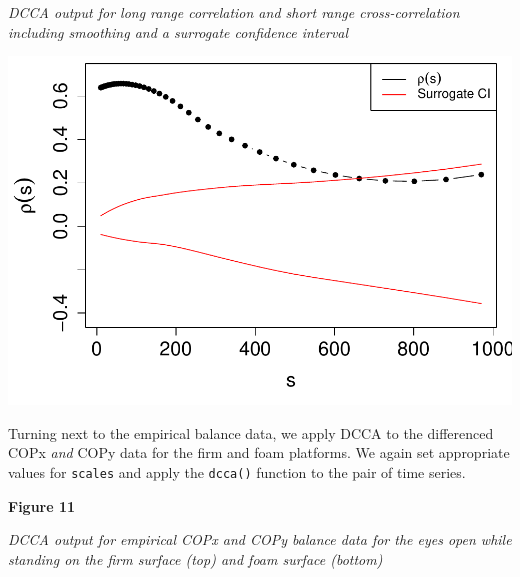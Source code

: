 \documentclass[
  man]{apa6}
\begin{document}
\emph{DCCA output for long range correlation and short range
cross-correlation including smoothing and a surrogate confidence
interval}

\includegraphics{fractal_regression_paper_brm_files/figure-latex/unnamed-chunk-20-1.pdf}

Turning next to the empirical balance data, we apply DCCA to the
differenced COPx \emph{and} COPy data for the firm and foam platforms. We
again set appropriate values for \texttt{scales} and apply the \texttt{dcca()}
function to the pair of time series.

\textbf{Figure 11}

\emph{DCCA output for empirical COPx and COPy balance data for the eyes open
while standing on the firm surface (top) and foam surface (bottom)}
\end{document}
